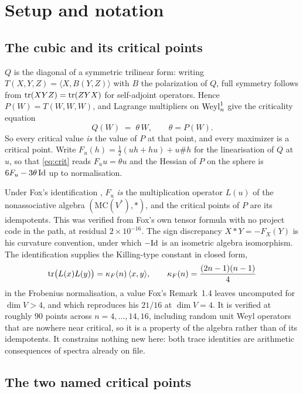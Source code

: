 \section{Setup and notation}

\subsection{The cubic and its critical points}

$Q$ is the diagonal of a symmetric trilinear form: writing $T(X,Y,Z)=\langle X,B(Y,Z)\rangle$ with $B$ the polarization of $Q$, full symmetry follows from $\operatorname{tr}(XYZ)=\operatorname{tr}(ZYX)$ for self-adjoint operators. Hence $P(W)=T(W,W,W)$, and Lagrange multipliers on $\mathrm{Weyl}^1_n$ give the criticality equation
\begin{equation}\label{eq:crit}
Q(W)\;=\;\theta\,W,\qquad \theta=P(W).
\end{equation}
So every critical value \emph{is} the value of $P$ at that point, and every maximizer is a critical point. Write $F_u(h)=\tfrac12(uh+hu)+u\#h$ for the linearisation of $Q$ at $u$, so that \eqref{eq:crit} reads $F_u u=\theta u$ and the Hessian of $P$ on the sphere is $6F_u-3\theta\,\mathrm{Id}$ up to normalisation.

\begin{remarkstar}
Under Fox's identification \cite{fox2019}, $F_u$ \emph{is} the multiplication operator $L(u)$ of the nonassociative algebra $(\mathrm{MC}(V^{*}),*)$, and the critical points of $P$ are its idempotents. This was verified from Fox's own tensor formula with no project code in the path, at residual $2\times10^{-16}$. The sign discrepancy $X*Y=-F_X(Y)$ is his curvature convention, under which $-\mathrm{Id}$ is an isometric algebra isomorphism. The identification supplies the Killing-type constant in closed form,
\[
\operatorname{tr}\!\big(L(x)L(y)\big)=\kappa_F(n)\,\langle x,y\rangle,\qquad \kappa_F(n)=\frac{(2n-1)(n-1)}{4}
\]
in the Frobenius normalisation, a value Fox's Remark~1.4 leaves uncomputed for $\dim V>4$, and which reproduces his $21/16$ at $\dim V=4$. It is verified at roughly $90$ points across $n=4,\dots,14,16$, including random unit Weyl operators that are nowhere near critical, so it is a property of the algebra rather than of its idempotents. It constrains nothing new here: both trace identities are arithmetic consequences of spectra already on file.
\end{remarkstar}

\subsection{The two named critical points}

